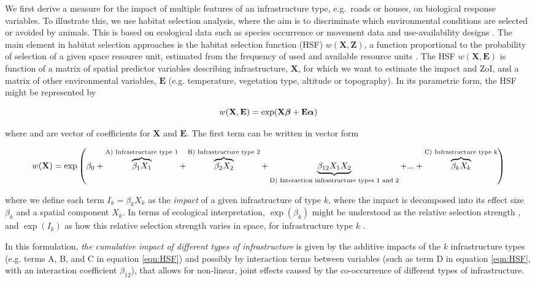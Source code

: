 \documentclass[titlepage]{article}
\begin{document}
We first derive a measure for the impact of multiple features of an infrastructure type, e.g.\ roads or houses, on biological response variables. To illustrate this, we use habitat selection analysis, where the aim is to discriminate which environmental conditions are selected or avoided by animals. This is based on ecological data such as species occurrence or movement data and use-availability designs \citep{fieberg_how_2021}. The main element in habitat selection approaches is the habitat selection function (HSF) $w(\textbf{X},\textbf{Z})$, a function proportional to the probability of selection of a given space resource unit, estimated from the frequency of used and available resource units \citep{thurfjell_applications_2014}. The HSF $w(\textbf{X},\textbf{E})$ is function of a matrix of spatial predictor variables describing infrastructure, $\textbf{X}$, for which we want to estimate the impact and ZoI, and a matrix of other environmental variables, $\textbf{E}$ (e.g. temperature, vegetation type, altitude or topography). In its parametric form, the HSF might be represented by

\begin{equation}
\centering
\label{eqn:HSFgeneral}
    w(\textbf{X},\textbf{E}) = \exp (\textbf{X} \bm{\beta} + \textbf{E} \bm{\alpha})
\end{equation}

where \bm{$\beta$} and \bm{$\alpha$} are vector of coefficients for $\textbf{X}$ and $\textbf{E}$. The first term can be written in vector form

\begin{equation}
\centering
\label{eqn:HSF}
    w(\textbf{X}) = \exp \left( \beta_0 + \overbrace{\beta_1 X_1}^\text{A) Infrastructure type 1} + \overbrace{\beta_2 X_2}^\text{B) Infrastructure type 2} + \underbrace{\beta_{12} X_1 X_2}_\text{D) Interaction infrastructure types 1 and 2} + ... + \overbrace{\beta_k X_k}^\text{C) Infrastructure type k} \right)
\end{equation}

where we define each term $I_k = \beta_k X_k$ as the \textit{impact} of a given infrastructure of type $k$, where the impact is decomposed into its effect size $\beta_k$ and a spatial component $X_k$. In terms of ecological interpretation, $\exp(\beta_k)$ might be understood as the relative selection strength \citep{avgar_relative_2017}, and $\exp(I_k)$ as how this relative selection strength varies in space, for infrastructure type $k$ \citep{fieberg_how_2021}.

In this formulation, \textit{the cumulative impact of different types of infrastructure} is given by the additive impacts of the $k$ infrastructure types (e.g. terms A, B, and C in equation \ref{eqn:HSF}) and possibly by interaction terms between variables (such as term D in equation \ref{eqn:HSF}, with an interaction coefficient $\beta_{12}$), that allows for non-linear, joint effects caused by the co-occurrence of different types of infrastructure. 
\end{document}
